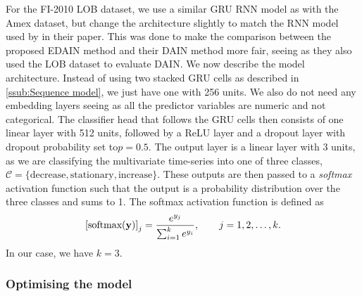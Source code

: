 \documentclass{statsmsc}
\begin{document}
{For the FI-2010 \ac{LOB} dataset, we use
a similar \ac{GRU} \ac{RNN} model as with the Amex dataset, but change the architecture slightly
to match the \ac{RNN}
model used by \cite{dain} in their paper. This was done to make the comparison between the
proposed \ac{EDAIN} method and their \ac{DAIN} method more fair, seeing as they also used the
\ac{LOB} dataset to evaluate \ac{DAIN}.
We now describe the model architecture.
Instead of using two stacked \ac{GRU} cells as described in
\cref{ssub:Sequence model}, we just have one with 256 units.
We also do not need any embedding layers seeing as all the predictor variables are numeric and not
categorical.
The classifier head that follows the \ac{GRU} cells then consists of one linear
layer with 512 units, followed by a \ac{ReLU} layer and a dropout layer with dropout probability
set to$p=0.5$.  The output layer is
a linear layer with 3 units, as we are classifying the multivariate time-series into one of
three classes, $\mathcal{C}=\{\textrm{decrease}, \textrm{stationary}, \textrm{increase}\}$.
These outputs are then passed to a \textit{softmax} activation function such that the
output is a probability distribution over the three classes and sums to 1.
The softmax activation function is defined as
\begin{equation}
    \left[\textrm{softmax}(\mathbf{y})\right]_j=\frac{e^{y_j}}{\sum^{k}_{i=1} e^{y_i}} ,\qquad j=1,2,\dots,k.
\end{equation}
In our case, we have $k=3$.

\subsubsection{Optimising the model}%
\label{ssub:as8dhasdh}

}
\end{document}
